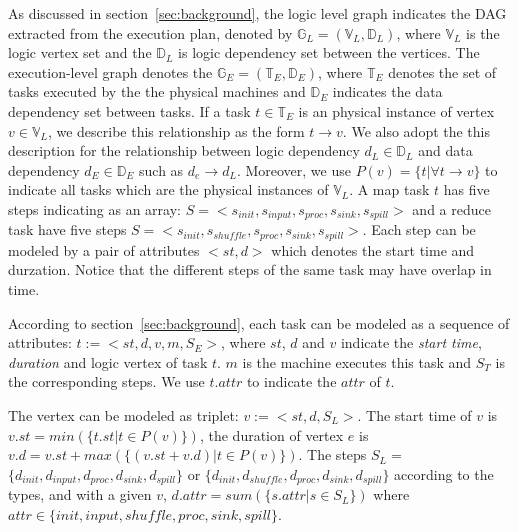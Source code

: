 As discussed in section~\ref{sec:background}, the logic level graph indicates the DAG extracted from the execution plan, denoted by $\mathbb{G}_L = (\mathbb{V}_L, \mathbb{D}_L)$, where $\mathbb{V}_L$ is the logic vertex set and the $\mathbb{D}_L$ is logic dependency set between the vertices. The execution-level graph denotes the $\mathbb{G}_E = (\mathbb{T}_E, \mathbb{D}_E)$, where $\mathbb{T}_E$ denotes the set of tasks executed by the the physical machines and $\mathbb{D}_E$ indicates the data dependency set between tasks. 
If a task $t \in \mathbb{T}_E$ is an physical instance of vertex $v \in \mathbb{V}_L$, we describe this relationship as the form $t \to v$. We also adopt the this description for the relationship between logic dependency $d_L \in \mathbb{D}_L$ and data dependency $d_E \in \mathbb{D}_E$ such as $d_e \to d_L$. Moreover, we use $P(v) = \{t|\forall t \to v\}$ to indicate all tasks which are the physical instances of $\mathbb{V}_L$. 
A map task $t$ has five steps indicating as an array: $S=<s_{init}, s_{input}, s_{proc}, s_{sink}, s_{spill}>$ and a reduce task have five steps $S=<s_{init}, s_{shuffle}, s_{proc}, s_{sink}, s_{spill}>$. Each step can be modeled by a pair of attributes $<st, d>$ which denotes the start time and durzation. Notice that the different steps of the same task may have overlap in time.

According to section~\ref{sec:background}, each task can be modeled as a sequence of attributes: $t:=<st, d, v, m, S_E>$, where $st$, $d$ and $v$ indicate the \textit{start time}, \textit{duration} and logic vertex of task $t$.  $m$ is the machine executes this task and $S_T$ is the corresponding steps. We use $t.attr$ to indicate the $attr$ of $t$.

The vertex can be modeled as triplet: $v:=<st, d, S_L>$. The start time of $v$ is $v.st=min(\{t.st|t \in P(v)\})$, the duration of vertex $e$ is $v.d=v.st+max(\{(v.st+v.d)|t \in P(v) \})$. The steps $S_L=$ $\{d_{init}, d_{input}, d_{proc}, d_{sink}, d_{spill}\}$ or $\{d_{init}, d_{shuffle}, d_{proc}, d_{sink}, d_{spill}\}$ according to the types, and with a given $v$, $d.attr = sum(\{s.attr| s\in S_L\})$ where $attr \in \{init, input, shuffle, proc, sink, spill\}$. 